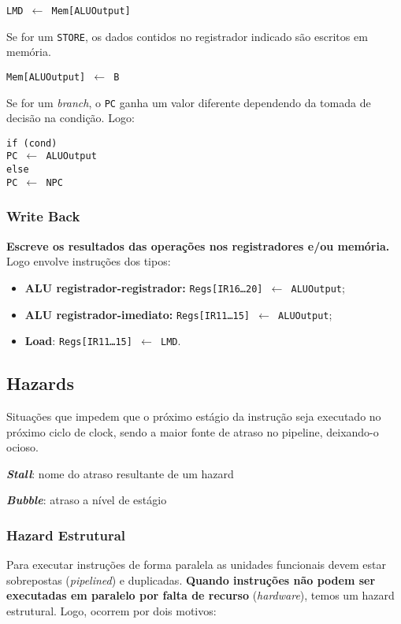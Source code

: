 \texttt{LMD $\leftarrow$ Mem[ALUOutput]}

Se for um \texttt{STORE}, os dados contidos no registrador indicado são escritos em memória.

\texttt{Mem[ALUOutput] $\leftarrow$ B}

Se for um \textit{branch}, o \texttt{PC} ganha um valor diferente dependendo da tomada de decisão na condição. Logo:

\texttt{if (cond)}\\
\texttt{PC $\leftarrow$ ALUOutput}\\
\texttt{else}\\
\texttt{PC $\leftarrow$ NPC}\\



\subsubsection*{Write Back}
\textbf{Escreve os resultados das operações nos registradores e/ou memória.} Logo envolve instruções dos tipos:

\begin{itemize}
  \item \textbf{ALU registrador-registrador:} \texttt{Regs[IR16\dots 20] $\leftarrow$ ALUOutput};

  \item \textbf{ALU registrador-imediato:} \texttt{Regs[IR11\dots 15] $\leftarrow$ ALUOutput};

  \item \textbf{Load}: \texttt{Regs[IR11\dots 15] $\leftarrow$ LMD}.
\end{itemize}




\subsection{Hazards}
Situações que impedem que o próximo estágio da instrução seja executado no próximo ciclo de clock, sendo a maior fonte de atraso no pipeline, deixando-o ocioso.

\textbf{\textit{Stall}}: nome do atraso resultante de um hazard

\textbf{\textit{Bubble}}: atraso a nível de estágio



\subsubsection{Hazard Estrutural}
Para executar instruções de forma paralela as unidades funcionais devem estar sobrepostas (\textit{pipelined}) e duplicadas. \textbf{Quando instruções não podem ser executadas em paralelo por falta de recurso} (\textit{hardware}), temos um hazard estrutural. Logo, ocorrem por dois motivos:

